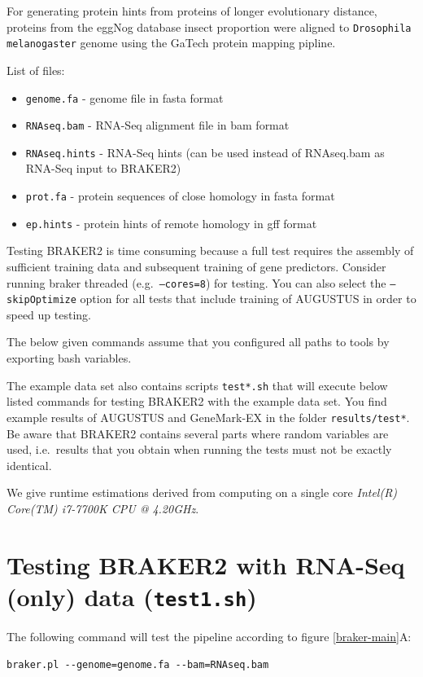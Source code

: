 \documentclass[a4paper,10pt]{report}
\begin{document}
For generating protein hints from proteins of longer evolutionary distance, proteins from the eggNog database insect proportion were aligned to \texttt{Drosophila melanogaster} genome using the GaTech protein mapping pipline.

List of files:

\begin{itemize}
 \item \texttt{genome.fa} - genome file in fasta format
 \item \texttt{RNAseq.bam} - RNA-Seq alignment file in bam format
 \item \texttt{RNAseq.hints} - RNA-Seq hints (can be used instead of RNAseq.bam as RNA-Seq input to BRAKER2)
 \item \texttt{prot.fa} - protein sequences of close homology in fasta format
 \item \texttt{ep.hints} - protein hints of remote homology in gff format
\end{itemize}


Testing BRAKER2 is time consuming because a full test requires the assembly of sufficient training data and subsequent training of gene predictors. Consider running braker threaded (e.g.~\texttt{--cores=8}) for testing. You can also select the \texttt{--skipOptimize} option for all tests that include training of AUGUSTUS in order to speed up testing. 

The below given commands assume that you configured all paths to tools by exporting bash variables.

The example data set also contains scripts \texttt{test*.sh} that will execute below listed commands for testing BRAKER2 with the example data set. You find example results of AUGUSTUS and GeneMark-EX in the folder \texttt{results/test*}. Be aware that BRAKER2 contains several parts where random variables are used, i.e.~results that you obtain when running the tests must not be exactly identical.

We give runtime estimations derived from computing on a single core \textit{Intel(R) Core(TM) i7-7700K CPU @ 4.20GHz}.

\section{Testing BRAKER2 with RNA-Seq (only) data (\texttt{test1.sh})}

The following command will test the pipeline according to figure \ref{braker-main}A:

\begin{verbatim}
braker.pl --genome=genome.fa --bam=RNAseq.bam
\end{verbatim}
\end{document}
